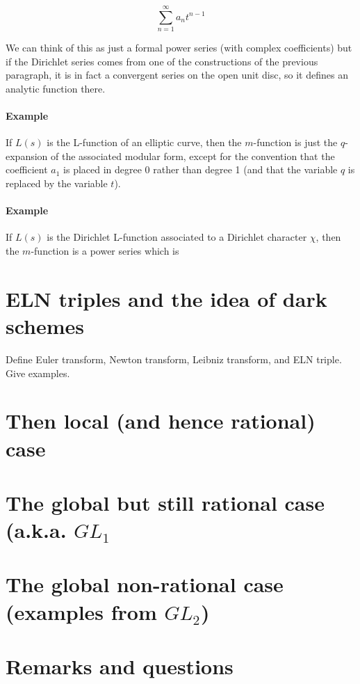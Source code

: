 \documentclass[paper=a4, fontsize=11pt]{scrartcl} %
\numberwithin{equation}{section} %
\numberwithin{figure}{section} %
\numberwithin{table}{section} %
\begin{document}
$$ \sum_{n = 1}^{\infty} a_n t^{n-1}   $$

We can think of this as just a formal power series (with complex coefficients) but if the Dirichlet series comes from one of the constructions of the previous paragraph, it is in fact a convergent series on the open unit disc, so it defines an analytic function there.


\paragraph{Example}

If $L(s)$ is the L-function of an elliptic curve, then the $m$-function is just the $q$-expansion of the associated modular form, except for the convention that the coefficient $a_1$ is placed in degree 0 rather than degree 1 (and that the variable $q$ is replaced by the variable $t$).


\paragraph{Example}

If $L(s)$ is the Dirichlet L-function associated to a Dirichlet character $\chi$, then the $m$-function is a power series which is

\section{ELN triples and the idea of dark schemes}

Define Euler transform, Newton transform, Leibniz transform, and ELN triple. Give examples.


\section{Then local (and hence rational) case}


\section{The global but still rational case (a.k.a. $GL_1$}


\section{The global non-rational case (examples from $GL_2$)}



\section{Remarks and questions}



\end{document}
